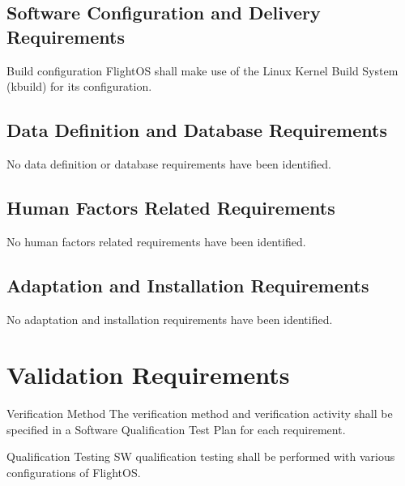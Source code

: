 \section{Software Configuration and Delivery Requirements}

 {Build configuration}{%
FlightOS shall make use of the Linux Kernel Build System (kbuild) for its
configuration.
}{}%


\section{Data Definition and Database Requirements}

No data definition or database requirements have been identified.


\section{Human Factors Related Requirements}

No human factors related requirements have been identified.

\section{Adaptation and Installation Requirements}

No adaptation and installation requirements have been identified.


\chapter{Validation Requirements}

 {Verification Method}{%
The verification method and verification activity shall be specified 
in a Software Qualification Test Plan for each requirement.
}{}%

 {Qualification Testing}{%
SW qualification testing shall be performed with various configurations of
FlightOS.
}{}%



